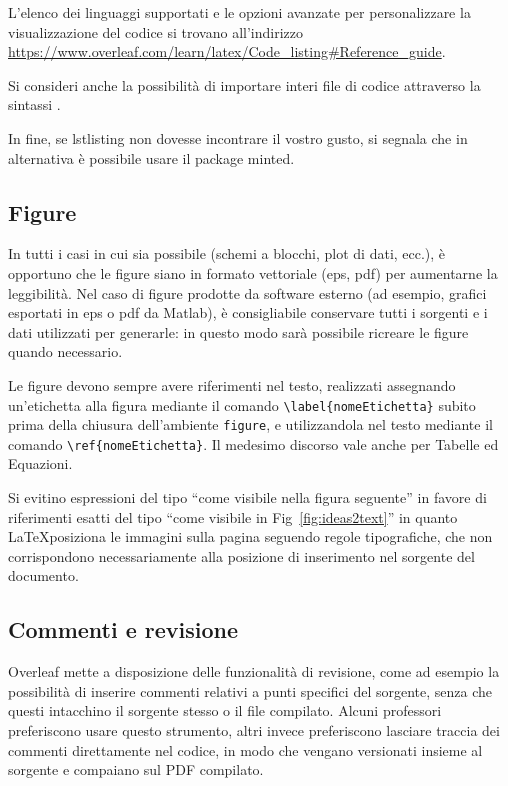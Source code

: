 \documentclass[12pt]{report}
\begin{document}
L'elenco dei linguaggi supportati e le opzioni avanzate per personalizzare la visualizzazione del codice si trovano all'indirizzo \url{https://www.overleaf.com/learn/latex/Code_listing#Reference_guide}.

Si consideri anche la possibilità di importare interi file di codice attraverso la sintassi \verb||.

In fine, se lstlisting non dovesse incontrare il vostro gusto, si segnala che in alternativa è possibile usare il package minted.

\subsection{Figure}

In tutti i casi in cui sia possibile (schemi a blocchi, plot di dati, ecc.), \`e opportuno che le figure siano in formato vettoriale (eps, pdf) per aumentarne la leggibilit\`a.
Nel caso di figure prodotte da software esterno (ad esempio, grafici esportati in eps o pdf da Matlab), \`e consigliabile conservare tutti i sorgenti e i dati utilizzati per generarle: in questo modo sarà possibile ricreare le figure quando necessario.

Le figure devono sempre avere riferimenti nel testo, realizzati assegnando un'etichetta alla figura mediante il comando \verb|\label{nomeEtichetta}| subito prima della chiusura dell'ambiente \verb|figure|, e utilizzandola nel testo mediante il comando \verb|\ref{nomeEtichetta}|. Il medesimo discorso vale anche per Tabelle ed Equazioni.

Si evitino espressioni del tipo ``come visibile nella figura seguente'' in favore di riferimenti esatti del tipo ``come visibile in Fig~\ref{fig:ideas2text}'' in quanto \LaTeX posiziona le immagini sulla pagina seguendo regole tipografiche, che non corrispondono necessariamente alla posizione di inserimento nel sorgente del documento.

\subsection{Commenti e revisione}

Overleaf mette a disposizione delle funzionalità di revisione, come ad esempio la possibilità di inserire commenti relativi a punti specifici del sorgente, senza che questi intacchino il sorgente stesso o il file compilato. Alcuni professori preferiscono usare questo strumento, altri invece preferiscono lasciare traccia dei commenti direttamente nel codice, in modo che vengano versionati insieme al sorgente e compaiano sul PDF compilato.
\end{document}
